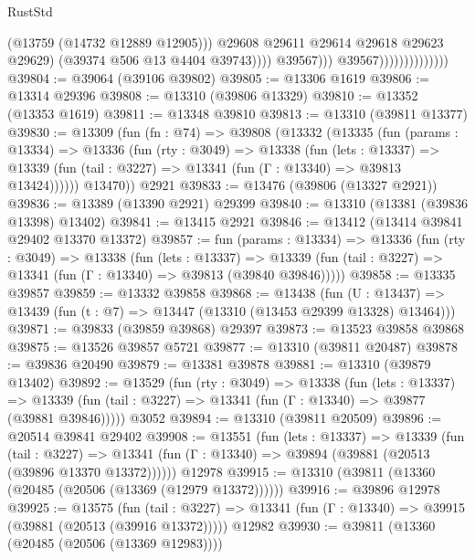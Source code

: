 \begin{lexlean}{RustStd}
\begin{coremodule}
                                                (@13759 (@14732 @12889 @12905)))
                                              @29608
                                              @29611
                                              @29614
                                              @29618
                                              @29623
                                              @29629)
                                            (@39374 @506 @13 @4404 @39743))))
                                      @39567)))
                                @39567))))))))))))))
@39804 := @39064 (@39106 @39802)
@39805 := @13306 @1619
@39806 := @13314 @29396
@39808 := @13310 (@39806 @13329)
@39810 := @13352 (@13353 @1619)
@39811 := @13348 @39810
@39813 := @13310 (@39811 @13377)
@39830 := @13309
    (fun (fn : @74) =>
    @39808
      (@13332
        (@13335
          (fun (params : @13334) =>
          @13336
            (fun (rty : @3049) =>
            @13338
              (fun (lets : @13337) =>
              @13339 (fun (tail : @3227) => @13341 (fun (Γ : @13340) => @39813 @13424))))))
        @13470))
    @2921
@39833 := @13476 (@39806 (@13327 @2921))
@39836 := @13389 (@13390 @2921) @29399
@39840 := @13310 (@13381 (@39836 @13398) @13402)
@39841 := @13415 @2921
@39846 := @13412 (@13414 @39841 @29402 @13370 @13372)
@39857 := fun (params : @13334) =>
  @13336
    (fun (rty : @3049) =>
    @13338
      (fun (lets : @13337) =>
      @13339 (fun (tail : @3227) => @13341 (fun (Γ : @13340) => @39813 (@39840 @39846)))))
@39858 := @13335 @39857
@39859 := @13332 @39858
@39868 := @13438
    (fun (U : @13437) => @13439 (fun (t : @7) => @13447 (@13310 (@13453 @29399 @13328) @13464)))
@39871 := @39833 (@39859 @39868) @29397
@39873 := @13523 @39858 @39868
@39875 := @13526 @39857 @5721
@39877 := @13310 (@39811 @20487)
@39878 := @39836 @20490
@39879 := @13381 @39878
@39881 := @13310 (@39879 @13402)
@39892 := @13529
    (fun (rty : @3049) =>
    @13338
      (fun (lets : @13337) =>
      @13339 (fun (tail : @3227) => @13341 (fun (Γ : @13340) => @39877 (@39881 @39846)))))
    @3052
@39894 := @13310 (@39811 @20509)
@39896 := @20514 @39841 @29402
@39908 := @13551
    (fun (lets : @13337) =>
    @13339
      (fun (tail : @3227) =>
      @13341 (fun (Γ : @13340) => @39894 (@39881 (@20513 (@39896 @13370 @13372))))))
    @12978
@39915 := @13310 (@39811 (@13360 (@20485 (@20506 (@13369 (@12979 @13372))))))
@39916 := @39896 @12978
@39925 := @13575
    (fun (tail : @3227) => @13341 (fun (Γ : @13340) => @39915 (@39881 (@20513 (@39916 @13372)))))
    @12982
@39930 := @39811 (@13360 (@20485 (@20506 (@13369 @12983))))

\end{coremodule}
\end{lexlean}
